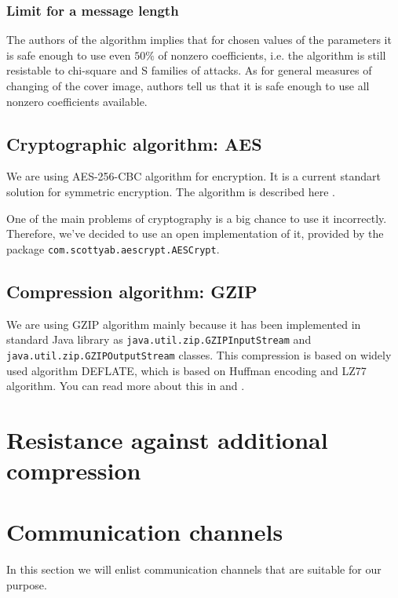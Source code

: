 \subsubsection{Limit for a message length}
The authors of the algorithm implies that for chosen values of the parameters
it is safe enough to use even $50\%$ of nonzero coefficients, i.e. the algorithm
is still resistable to chi-square and S families of attacks. As for general measures
of changing of the cover image, authors tell us that it is safe enough to use all
nonzero coefficients available.

\subsection{Cryptographic algorithm: AES}

We are using AES-256-CBC algorithm for encryption. It is a current standart
solution for symmetric encryption. The algorithm is described here \cite{standard2001announcing}.

One of the main problems of cryptography is a big chance to use it incorrectly.
Therefore, we've decided to use an open implementation of it, provided by the package
\texttt{com.scottyab.aescrypt.AESCrypt}. 


\subsection{Compression algorithm: GZIP}
We are using GZIP algorithm mainly because it has been implemented in standard
Java library as \texttt{java.util.zip.GZIPInputStream} and 
\texttt{java.util.zip.GZIPOutputStream} classes. This compression
is based on widely used algorithm DEFLATE, which is based on Huffman encoding and LZ77 algorithm.
You can read more about this in \cite{deutsch1996deflate} and \cite{deutsch1996gzip}.

\section{Resistance against additional compression}


\section{Communication channels}
In this section we will enlist communication channels that are suitable for our purpose.

